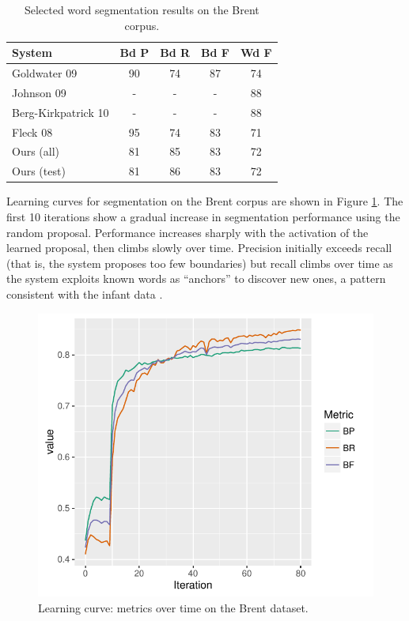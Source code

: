 \documentclass[11pt,letterpaper]{article}
\begin{document}
\begin{table}
\begin{tabular}{p{2.1cm}cccc}
System & Bd P & Bd R & Bd F & Wd F\\
\hline
Goldwater 09       & 90 & 74 & 87 & 74\\ 
Johnson 09         & - & - & - & 88\\
Berg-Kirkpatrick 10 & - & - & - & 88\\
Fleck 08           & 95 & 74 & 83 & 71\\
\hline
Ours (all) & 81 & 85 & 83 & 72\\
Ours (test) & 81 & 86 & 83 & 72\\
\end{tabular}
\caption{Selected word segmentation results on the Brent corpus.}
\label{tab-results}
\end{table}

Learning curves for segmentation on the Brent corpus are shown in
Figure \ref{fig-learning-curve}. The first 10 iterations show a
gradual increase in segmentation performance using the random
proposal. Performance increases sharply with the activation of
the learned proposal, then climbs slowly over time. Precision
initially exceeds recall (that is, the system proposes too few
boundaries) but recall climbs over time as the system exploits known
words as ``anchors'' to discover new ones, a pattern consistent with
the infant data \cite{Bortfeld05}.

\begin{figure}
\includegraphics[width=\columnwidth]{learning-curve.pdf}
\caption{Learning curve: metrics over time on the Brent dataset.}
\label{fig-learning-curve}
\end{figure}
\end{document}
